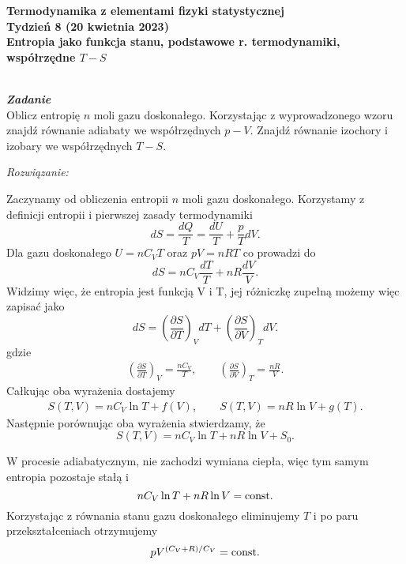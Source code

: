 \documentclass[11pt,a4paper]{article}
\newcounter{zadanie}\newcommand{\zadanie}[1][]{\addtocounter{zadanie}{1} ~\\  {\bf \emph{Zadanie \arabic{zadanie} #1 }} \\}
\begin{document}

\begin{centering}
\bf{\Large{Termodynamika z elementami fizyki statystycznej}}\\
Tydzień 8 (20 kwietnia 2023)\\[3mm]
Entropia jako funkcja stanu, podstawowe r. termodynamiki, współrzędne $T-S$\\
\end{centering} 
\vspace{5mm}

\zadanie
Oblicz entropię $n$ moli gazu doskonałego. Korzystając z wyprowadzonego
wzoru znajdź równanie adiabaty we współrzędnych $p - V$.
Znajdź równanie izochory  i izobary we współrzędnych $T-S$.


\vspace{5mm}
{\em Rozwiązanie:}

Zaczynamy od obliczenia entropii $n$ moli gazu doskonałego.
Korzystamy z definicji entropii i pierwszej zasady termodynamiki
\begin{equation}
	dS = \frac{dQ}{T} = \frac{dU}{T} + \frac{p}{T}dV.
\end{equation}
Dla gazu doskonałego $U = n C_V T$ oraz $p V = nRT$ co prowadzi do 
\begin{equation}
	dS = n C_V \frac{dT}{T} + n R \frac{dV}{V}.
\end{equation}
Widzimy więc, że entropia jest funkcją V i T, jej różniczkę zupełną możemy więc zapisać jako
\begin{equation}
	dS = \left(\frac{\partial S}{\partial T} \right)_V dT + \left(\frac{\partial S}{\partial V} \right)_T dV.
\end{equation}
gdzie
\begin{align}
	\left(\frac{\partial S}{\partial T} \right)_V = \frac{n C_V}{T}, \qquad  \left(\frac{\partial S}{\partial V} \right)_T = \frac{nR}{V}.
\end{align}
Całkując oba wyrażenia dostajemy
\begin{align}
	S(T,V) = n C_V \ln T + f(V), \qquad S(T,V) = n R \ln V + g(T).
\end{align}
Następnie porównując oba wyrażenia stwierdzamy, że
\begin{equation}
	S(T,V) = n C_V \ln T + n R \ln V + S_0.
\end{equation}

W procesie adiabatycznym, nie zachodzi wymiana ciepła, więc tym samym entropia pozostaje stałą i
\begin{equation}
	n C_V \ln T + n R \ln V = {\rm const}.
\end{equation}
Korzystając z równania stanu gazu doskonałego eliminujemy $T$ i po paru przekształceniach otrzymujemy
\begin{equation}
	p V^{(C_V + R)/C_V} = {\rm const}.
\end{equation}
\end{document}
